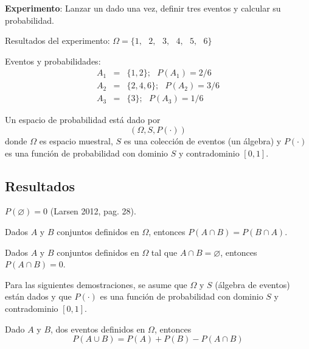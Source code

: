 \begin{example}
 \textbf{Experimento}: Lanzar un dado una vez, definir tres eventos y calcular su probabilidad.

Resultados del experimento: $\Omega =\{1,\text{ }2,\text{ }3,\text{ }4,\text{ }5,\text{ }6\}$

Eventos y probabilidades:
\begin{eqnarray*}
A_{1} &=&\{1,2\};\text{ }P(A_{1})=2/6 \\
A_{2} &=&\{2,4,6\};\text{ }P(A_{2})=3/6 \\
A_{3} &=&\{3\};\text{ }P(A_{3})=1/6
\end{eqnarray*}   
\end{example}



\begin{definition}
Un espacio de probabilidad está dado por 
\begin{equation*}
(\Omega,S,P(\cdot ))
\end{equation*}
donde $\Omega$ es espacio muestral, $S$ es una colección de eventos (un álgebra) y $P(\cdot)$ es una función de probabilidad con dominio $S$ y contradominio $[0,1]$.
\end{definition}


\subsection{Resultados} 

\begin{property}
$P(\varnothing)=0$ (Larsen 2012, pag. 28).
\end{property}

\begin{property} Dados $A$ y $B$ conjuntos definidos en $\Omega $, entonces $P(A\cap B)=P(B\cap A)$.
\end{property}

\begin{property} Dados $A$ y $B$ conjuntos definidos en $\Omega $ tal que $A\cap B=\varnothing$, entonces $P(A\cap B)=0$.
\end{property}
Para las siguientes demostraciones, se asume que $\Omega$ y $S$ (álgebra de eventos) están dados y que $P(\cdot)$ es una función de probabilidad con dominio $S$ y contradominio $[0,1]$.

\begin{theorem}
Dado $A$ y $B$, dos eventos definidos en $\Omega$, entonces 
\begin{equation*}
P(A\cup B)=P(A)+P(B)-P(A\cap B)
\end{equation*}
\end{theorem}

